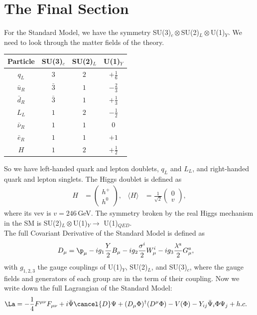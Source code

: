 \documentclass[relqm.tex]{subfiles}
\begin{document}
\section{The Final Section}
For the Standard Model, we have the symmetry SU(3)$_c\otimes$SU(2)$_L\otimes$U(1)$_Y$.
We need to look through the matter fields of the theory. 
\begin{table}[H]
    \centering
    \begin{tabular}{c|ccc}
        \hline\hline
        \bfseries Particle &\bfseries SU(3)$_c$ &\bfseries SU(2)$_L$ &\bfseries U(1)$_Y$ \\
        \hline\hline
        $q_L$ & $3$ & $2$ & $+\frac16$ \\ 
        $\bar{u}_R$ & $\bar{3}$ & $1$ & $-\frac23$ \\
        $\bar{d}_R$ & $\bar{3}$ & $1$ & $+\frac13$ \\
        $L_L$ & $1$ & $2$ & $-\frac12$ \\
        $\bar{\nu}_R$ & $1$ & $1$ & $0$ \\
        $\bar{e}_R$ & $1$ & $1$ & $+1$ \\
        \hline 
        $H$ & $1$ & $2$ & $+\frac12$ \\
        \hline\hline
    \end{tabular}
\end{table}
So we have left-handed quark and lepton doublets, $q_L$ and $L_L$, and right-handed quark and lepton singlets.
The Higgs doublet is defined as
\begin{align}
    H &= \begin{pmatrix} h^+ \\ h^0\end{pmatrix}, & \langle H\rangle &= \frac{1}{\sqrt{2}}\begin{pmatrix} 0 \\ v\end{pmatrix},
\end{align}
where its vev is $v=246\,$GeV.
The symmetry broken by the real Higgs mechanism in the SM is SU(2)$_L\otimes$U(1)$_Y\to$ U(1)$_{QED}$.\\
The full Covariant Derivative of the Standard Model is defined as
\begin{align}
    D_\mu &= \p_\mu - ig_1\frac{Y}{2}B_\mu - ig_2\frac{\sigma^i}{2}W^i_\mu - ig_3\frac{\lambda^a}{2}G_\mu^a,
\end{align}
with $g_{1,2,3}$ the gauge couplings of U(1)$_Y$, SU(2)$_L$, and SU(3)$_c$, where the gauge fields and generators of each group are in the term of their coupling. 
Now we write down the full Lagrangian of the Standard Model:
\begin{align}
    \La &= -\frac14F^{\mu\nu}F_{\mu\nu} + i\bar{\Psi}\cancel{D}\Psi + (D_\mu\Phi)^\dagger(D^\mu\Phi) - V(\Phi) - Y_{ij}\bar{\Psi}_i\Phi\Psi_j + h.c.
\end{align}
\end{document}
